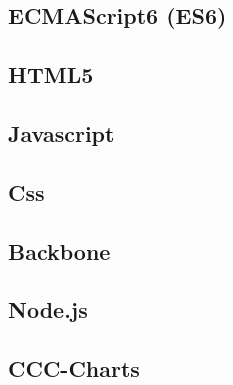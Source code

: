 \begin{spacing}{1.5}
	\subsection{ECMAScript6 (ES6)}
			\lipsum[1-2]
	\subsection{HTML5}
			\lipsum[1-2]
	\subsection{Javascript}
			\lipsum[1-2]
	\subsection{Css}
			\lipsum[1-2]
	\subsection{Backbone}
			\lipsum[1-2]
	\subsection{Node.js}
			\lipsum[1-2]
	\subsection{CCC-Charts}
			\lipsum[1-2]
\end{spacing}
		
		
		
